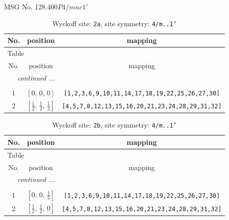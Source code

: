 \documentclass[fleqn,8pt]{jsarticle}
\begin{document}
\setcounter{MaxMatrixCols}{32}

\renewcommand{\tablename}{Table~}
\renewcommand{\figurename}{Figure~}
\begin{center}
\LARGE
MSG No. 128.400\quad$P4/mnc1'$
\end{center}
\renewcommand{\arraystretch}{1.2}
\begin{longtable}{ccc}
\caption{Wyckoff site: {\tt 2a}, site symmetry: {\tt 4/m..1'}}
 \\
 \hline \hline
No. & position & mapping \\ \hline \endfirsthead

\multicolumn{2}{l}{\tablename\ \thetable{}} \\
 \hline \hline
No. & position & mapping \\ \hline \endhead

 \hline \hline
\multicolumn{2}{r}{\footnotesize\it continued ...} \\ \endfoot

 \hline \hline
\multicolumn{2}{r}{} \\ \endlastfoot

1 & $\left[ 0,\, 0,\, 0 \right]$ & {\tt [1,2,3,6,9,10,11,14,17,18,19,22,25,26,27,30]} \\ \hline
2 & $\left[ \frac{1}{2},\, \frac{1}{2},\, \frac{1}{2} \right]$ & {\tt [4,5,7,8,12,13,15,16,20,21,23,24,28,29,31,32]} \\
\end{longtable}
\renewcommand{\arraystretch}{1.2}
\begin{longtable}{ccc}
\caption{Wyckoff site: {\tt 2b}, site symmetry: {\tt 4/m..1'}}
 \\
 \hline \hline
No. & position & mapping \\ \hline \endfirsthead

\multicolumn{2}{l}{\tablename\ \thetable{}} \\
 \hline \hline
No. & position & mapping \\ \hline \endhead

 \hline \hline
\multicolumn{2}{r}{\footnotesize\it continued ...} \\ \endfoot

 \hline \hline
\multicolumn{2}{r}{} \\ \endlastfoot

1 & $\left[ 0,\, 0,\, \frac{1}{2} \right]$ & {\tt [1,2,3,6,9,10,11,14,17,18,19,22,25,26,27,30]} \\ \hline
2 & $\left[ \frac{1}{2},\, \frac{1}{2},\, 0 \right]$ & {\tt [4,5,7,8,12,13,15,16,20,21,23,24,28,29,31,32]} \\
\end{longtable}
\end{document}

